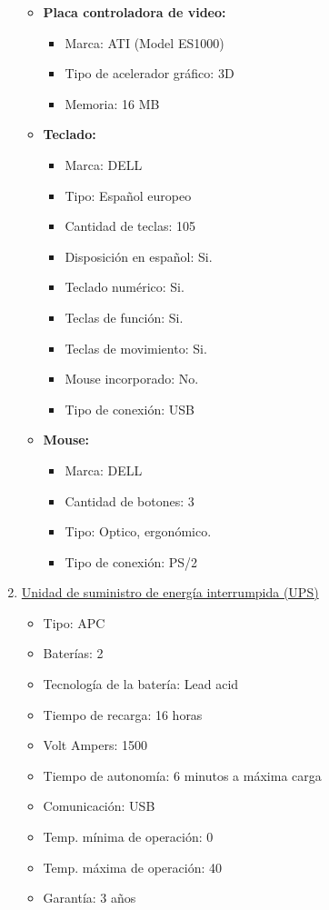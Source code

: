 \begin{enumerate}
\begin{itemize}
    \item \textbf{Placa controladora de video:}
    \begin{itemize}
      \item Marca: ATI (Model ES1000)
      \item Tipo de acelerador gráfico: 3D
      \item Memoria: 16 MB
    \end{itemize}
    
    \item \textbf{Teclado:}
    \begin{itemize}
      \item Marca: DELL
      \item Tipo: Español europeo
      \item Cantidad de teclas: 105
      \item Disposición en español: Si.
      \item Teclado numérico: Si.
      \item Teclas de función: Si.
      \item Teclas de movimiento: Si.
      \item Mouse incorporado: No.
      \item Tipo de conexión: USB
    \end{itemize}
    
    \item \textbf{Mouse:}
    \begin{itemize}
      \item Marca: DELL
      \item Cantidad de botones: 3
      \item Tipo: Optico, ergonómico.
      \item Tipo de conexión: PS/2
    \end{itemize}
  \end{itemize}
  
  \item \underline{Unidad de suministro de energía interrumpida (UPS)}
  \begin{itemize}
    \item Tipo: APC
    \item Baterías: 2
    \item Tecnología de la batería: Lead acid
    \item Tiempo de recarga: 16 horas
    \item Volt Ampers: 1500
    \item Tiempo de autonomía: 6 minutos a máxima carga
    \item Comunicación: USB
    \item Temp. mínima de operación: 0 \textcelsius
    \item Temp. máxima de operación: 40 \textcelsius
    \item Garantía: 3 años 
  \end{itemize}
      
\end{enumerate}
